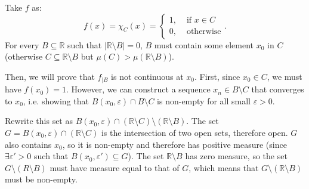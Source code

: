 \begin{enumerate}[label=\textbf{2E.\arabic*}]
  Take \( f \) as:
  \[
    f(x) = \chi_{C}(x) = \begin{cases}
      1, &\text{ if } x \in C\\
      0, & \text{ otherwise}
    \end{cases}
  .\] 
  For every \( B \subseteq \mathbb{R} \) such that \( |\mathbb{R} \setminus
  B| = 0\), \( B \) must contain some element \( x_{0} \) in \( C \) (otherwise \( C
  \subseteq \mathbb{R} \setminus B \) but \( \mu (C) > \mu (\mathbb{R} \setminus
  B) \)).

  Then, we will prove that \( f_{|B} \) is not continuous at \( x_{0} \). First,
  since \( x_{0} \in C \), we must have \( f(x_{0}) = 1 \). However, we can
  construct a sequence \( x_{n} \in B \setminus C \) that converges to \( x_{0}
  \), i.e. showing that \( B(x_{0}, \varepsilon) \cap B \setminus C \) is
  non-empty for all small \( \varepsilon > 0 \).

  Rewrite this set as \( B(x_{0}, \varepsilon) \cap (\mathbb{R} \setminus C)
  \setminus (\mathbb{R} \setminus B) \). The set \( G = B(x_{0}, \varepsilon)
  \cap (\mathbb{R} \setminus C ) \) is the intersection of two open sets,
  therefore open. \( G \) also contains \( x_{0} \), so it is non-empty and
  therefore has positive measure (since \( \exists \varepsilon' > 0 \) such that
  \( B(x_{0}, \varepsilon') \subseteq G \)). The set \( \mathbb{R} \setminus B
  \) has zero measure, so the set \( G \setminus (R \setminus B ) \) must have
  measure equal to that of \( G \), which means that \( G \setminus (\mathbb{R}
  \setminus B ) \) must be non-empty.


\end{enumerate}
